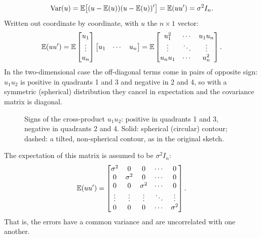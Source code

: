 \documentclass[11pt]{article}
\begin{document}
\[
  \operatorname{Var}(u)=\mathbb{E}\bigl[(u-\mathbb{E}(u))(u-\mathbb{E}(u))'\bigr]=\mathbb{E}(uu')=\sigma^2I_n .
\]
Written out coordinate by coordinate, with $u$ the $n\times1$ vector:
\[
  \mathbb{E}(uu')=\mathbb{E}\begin{bmatrix}u_1\\ \vdots\\ u_n\end{bmatrix}
              \begin{bmatrix}u_1 & \cdots & u_n\end{bmatrix}
          =\mathbb{E}\begin{bmatrix}
                 u_1^2     & \cdots & u_1u_n\\
                 \vdots    & \ddots & \vdots\\
                 u_nu_1    & \cdots & u_n^2
               \end{bmatrix}.
\]
In the two-dimensional case the off-diagonal terms come in pairs of opposite sign:
$u_1u_2$ is positive in quadrants 1 and 3 and negative in 2 and 4, so with a
symmetric (spherical) distribution they cancel in expectation and the covariance
matrix is diagonal.

\begin{figure}[ht]
\centering
{}
\caption{Signs of the cross-product $u_1u_2$: positive in quadrants 1 and 3,
negative in quadrants 2 and 4. Solid: spherical (circular) contour; dashed: a tilted,
non-spherical contour, as in the original sketch.}
\end{figure}

The expectation of this matrix is assumed to be $\sigma^2I_n$:
\[
  \mathbb{E}(uu')=\begin{bmatrix}
            \sigma^2 & 0        & 0        & \cdots & 0\\
            0        & \sigma^2 & 0        & \cdots & 0\\
            0        & 0        & \sigma^2 & \cdots & 0\\
            \vdots   & \vdots   & \vdots   & \ddots & \vdots\\
            0        & 0        & 0        & \cdots & \sigma^2
          \end{bmatrix} .
\]
That is, the errors have a common variance and are uncorrelated with one another.
\end{document}
